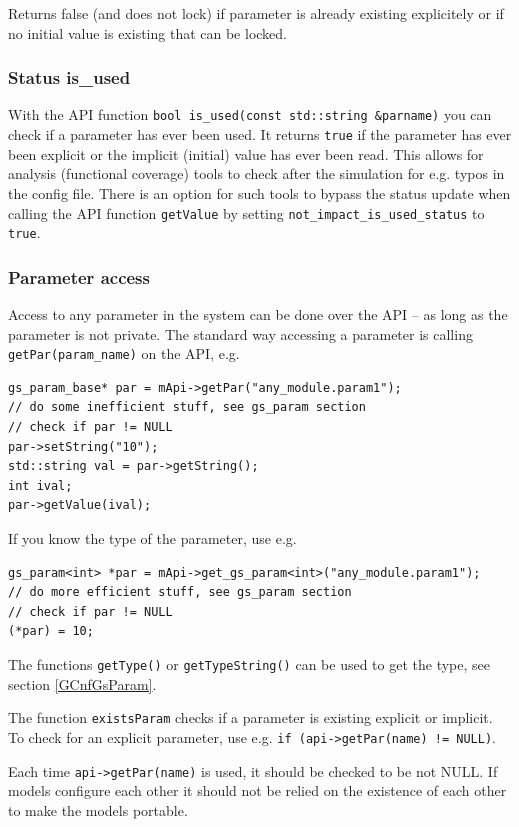     Returns false (and does not lock) if parameter is already existing explicitely or if no initial value is existing that can be locked.

\subsubsection{Status is\_used}
With the API function \lstinline|bool is_used(const std::string &parname)| you can check if a parameter has ever been used. It returns \lstinline|true| if the parameter has ever been explicit or the implicit (initial) value has ever been read. This allows for analysis (functional coverage) tools to check after the simulation for e.g. typos in the config file. There is an option for such tools to bypass the status update when calling the API function \lstinline|getValue| by setting \lstinline|not_impact_is_used_status| to \lstinline|true|.


\subsubsection{Parameter access}
Access to any parameter in the system can be done over the API -- as long as the parameter is not private. The standard way accessing a parameter is calling \lstinline|getPar(param_name)| on the API, e.g.

\begin{lstlisting}
gs_param_base* par = mApi->getPar("any_module.param1");
// do some inefficient stuff, see gs_param section
// check if par != NULL
par->setString("10");
std::string val = par->getString();
int ival;
par->getValue(ival);
\end{lstlisting}

If you know the type of the parameter, use e.g.
\begin{lstlisting}
gs_param<int> *par = mApi->get_gs_param<int>("any_module.param1");
// do more efficient stuff, see gs_param section
// check if par != NULL
(*par) = 10;
\end{lstlisting}

The functions \lstinline|getType()| or \lstinline|getTypeString()| can be used to get the type, see section \ref{GCnfGsParam}.

The function \lstinline|existsParam| checks if a parameter is existing explicit or implicit. To check for an explicit parameter, use e.g. \lstinline|if (api->getPar(name) != NULL)|.

Each time \lstinline|api->getPar(name)| is used, it should be checked to be not NULL. If models configure each other it should not be relied on the existence of each other to make the models portable.

